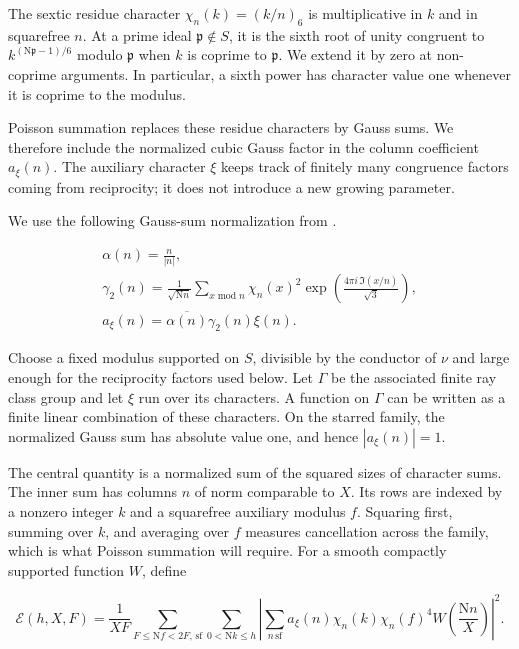 \documentclass[reqno,a4paper,11pt]{amsart}
\begin{document}
The sextic residue character $\chi_n(k)=(k/n)_6$ is multiplicative in $k$ and in squarefree $n$. At a prime ideal $\mathfrak{p}\notin S$, it is the sixth root of unity congruent to $k^{(\mathrm{N}\mathfrak{p}-1)/6}$ modulo $\mathfrak{p}$ when $k$ is coprime to $\mathfrak{p}$. We extend it by zero at non-coprime arguments. In particular, a sixth power has character value one whenever it is coprime to the modulus.

Poisson summation replaces these residue characters by Gauss sums. We therefore include the normalized cubic Gauss factor in the column coefficient $a_\xi(n)$. The auxiliary character $\xi$ keeps track of finitely many congruence factors coming from reciprocity; it does not introduce a new growing parameter.

We use the following Gauss-sum normalization from \cite[Section 4.1]{theta}.

\begin{equation}\label{eq:3}
\begin{gathered} \alpha \left( n\right) =\frac{n}{\left| n\right| }, \\ {\gamma }_{2}\left( n\right) =\frac{1}{\sqrt{\mathrm{N}n}}\sum _{x\;\mathrm{mod}\;n} {\chi }_{n}{\left( x\right) }^{2}\exp \left( \frac{4\pi i\,\Im \left( x/n\right) }{\sqrt{3}}\right) , \\ {a}_{\xi }\left( n\right) =\overline{\alpha \left( n\right) }{\gamma }_{2}\left( n\right) \xi \left( n\right) . \end{gathered}
\end{equation}

Choose a fixed modulus supported on $S$, divisible by the conductor of $\nu$ and large enough for the reciprocity factors used below. Let $\Gamma$ be the associated finite ray class group and let $\xi$ run over its characters. A function on $\Gamma$ can be written as a finite linear combination of these characters. On the starred family, the normalized Gauss sum has absolute value one, and hence $|a_\xi(n)|=1$.

The central quantity is a normalized sum of the squared sizes of character sums. The inner sum has columns $n$ of norm comparable to $X$. Its rows are indexed by a nonzero integer $k$ and a squarefree auxiliary modulus $f$. Squaring first, summing over $k$, and averaging over $f$ measures cancellation across the family, which is what Poisson summation will require. For a smooth compactly supported function $W$, define

\begin{equation}\label{eq:4}
\mathcal{E}\left( h,X,F\right) =\frac{1}{XF}\sum _{F\le \mathrm{N}f<2F,\,\mathrm{sf}} \sum _{0<\mathrm{N}k\le h} {\left| \sum _{n\,\mathrm{sf}} {a}_{\xi }\left( n\right) {\chi }_{n}\left( k\right) {\chi }_{n}{\left( f\right) }^{4}W\left( \frac{\mathrm{N}n}{X}\right) \right| }^{2}.
\end{equation}
\end{document}
